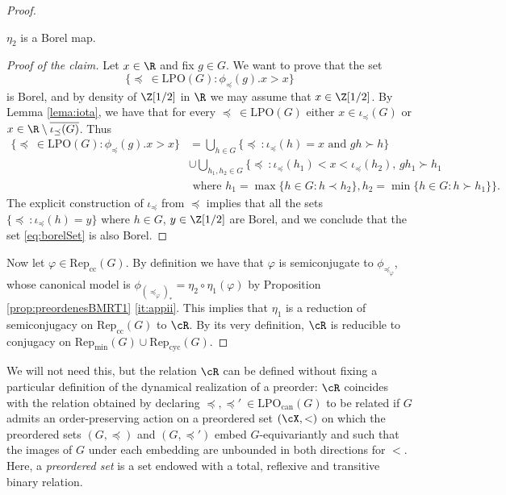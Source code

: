 \documentclass[reqno]{amsart}
\begin{document}
\begin{proof}
\begin{claimnum}
$\eta_2$ is a Borel map.
\end{claimnum}
\begin{proof}[Proof of the claim]
Let $x \in \R$ and fix $g \in G$. We want to prove that the set 
\[
	\{\preceq \ \in \mathrm{LPO}(G) : \phi_\preceq(g).x > x\}
\]
is Borel, and by density of $\Z[1/2]$ in $\R$ we may assume that $x \in \Z[1/2]$. By Lemma \ref{lema:iota}, we have that for every $\preceq \ \in \mathrm{LPO}(G)$ either $x \in \iota_\preceq(G)$ or $x \in \R \setminus \overline{\iota_\preceq(G)}$. Thus
\begin{align} \label{eq:borelSet}
\{\preceq \ \in \mathrm{LPO}(G) : \phi_\preceq(g).x > x\} & = \bigcup_{h \in G}\{\preceq \  : \iota_\preceq(h) = x \text{ and } gh \succ h\} \\
	& \cup \bigcup_{h_1, h_2 \in G} \{\preceq \ : \iota_\preceq(h_1) < x < \iota_\preceq(h_2),\, gh_1 \succ h_1 \nonumber \\  & \text{ where } h_1 = \max\{h \in G : h\prec h_2\}, h_2 = \min\{h \in G : h\succ h_1\} \}. \nonumber
\end{align}
The explicit construction of $\iota_\preceq$ from $\preceq$ implies that all the sets $\{\preceq \ : \iota_\preceq(h) = y\}$ where $h \in G$, $y \in \Z[1/2]$ are Borel, and we conclude that the set \eqref{eq:borelSet} is also Borel.
\end{proof}
Now let $\varphi \in \mathrm{Rep}_\mathrm{cc}(G)$. By definition we have that $\varphi$ is semiconjugate to $\phi_{\preceq_\varphi}$, whose canonical model is $\phi_{(\preceq_\varphi)_\ast} = \eta_2 \circ \eta_1(\varphi)$ by Proposition \ref{prop:preordenesBMRT1} \eqref{it:appii}. This implies that $\eta_1$ is a reduction of semiconjugacy on $\mathrm{Rep}_\mathrm{cc}(G)$ to $\cR$. By its very definition, $\cR$ is reducible to conjugacy on $\mathrm{Rep}_\mathrm{min}(G) \cup \mathrm{Rep}_\mathrm{cyc}(G)$.
\end{proof}

\begin{rmk}
 We will not need this, but the relation $\cR$ can be defined without fixing a particular definition of the dynamical realization of a preorder: $\cR$ coincides with the relation obtained by declaring $\preceq, \preceq' \  \in \mathrm{LPO}_\mathrm{can}(G)$ to be related if $G$ admits an order-preserving action on a preordered set $(\cX, <)$ on which the preordered sets $(G, \preceq)$ and $(G, \preceq')$ embed $G$-equivariantly and such that the images of $G$ under each embedding are unbounded in both directions for $<$. Here, a \emph{preordered set} is a set endowed with a total, reflexive and transitive binary relation.
\end{rmk}
\end{document}

